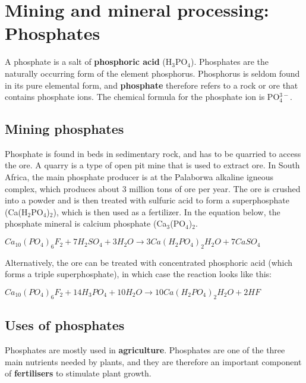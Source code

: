 



\section{Mining and mineral processing: Phosphates}

A phosphate is a salt of \textbf{phosphoric acid} (H$_{3}$PO$_{4}$). Phosphates are the naturally occurring form of the element phosphorus. Phosphorus is seldom found in its pure elemental form, and \textbf{phosphate} therefore refers to a rock or ore that contains phosphate ions. The chemical formula for the phosphate ion is PO$_{4}^{3-}$.

\subsection{Mining phosphates}

Phosphate is found in beds in sedimentary rock, and has to be quarried to access the ore. A quarry is a type of open pit mine that is used to extract ore. In South Africa, the main phosphate producer is at the Palaborwa alkaline igneous complex, which produces about 3 million tons of ore per year. The ore is crushed into a powder and is then treated with sulfuric acid to form a superphosphate (Ca(H$_{2}$PO$_{4}$)$_{2}$), which is then used as a fertilizer. In the equation below, the phosphate mineral is calcium phosphate (Ca$_{3}$(PO$_{4}$)$_{2}$.

\begin{center}
\rm${Ca_{10}(PO_{4})_{6}F_{2} + 7H_{2}SO_{4} + 3H_{2}O \rightarrow 3Ca(H_{2}PO_{4})_{2}H_{2}O + 7CaSO_{4}}$
\end{center}

Alternatively, the ore can be treated with concentrated phosphoric acid (which forms a triple superphosphate), in which case the reaction looks like this:

\begin{center}
\rm${Ca_{10}(PO_{4})_{6}F_{2} + 14H_{3}PO_{4} + 10H_{2}O \rightarrow 10Ca(H_{2}PO_{4})_{2}H_{2}O + 2HF}$
\end{center} 

\subsection{Uses of phosphates}

Phosphates are mostly used in \textbf{agriculture}. Phosphates are one of the three main nutrients needed by plants, and they are therefore an important component of \textbf{fertilisers} to stimulate plant growth. 

